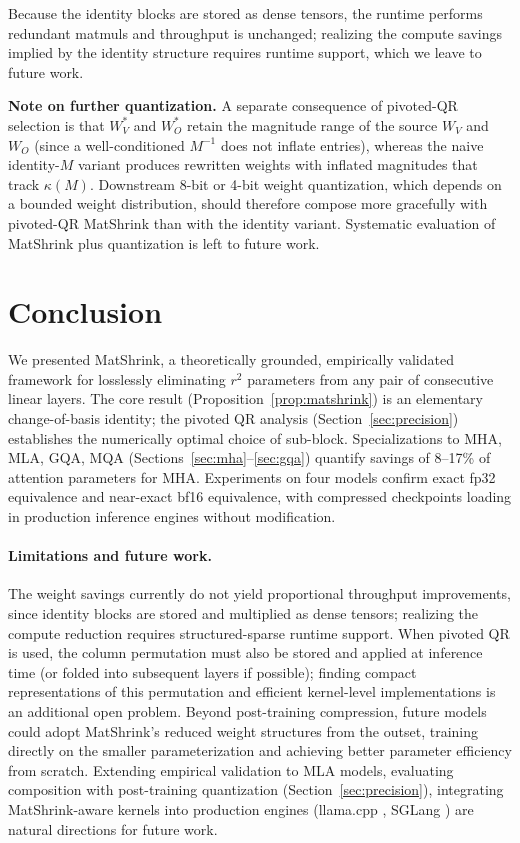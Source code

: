 \documentclass{article}
\begin{document}
Because the identity blocks are stored as dense tensors, the runtime performs redundant matmuls and throughput is unchanged; realizing the compute savings implied by the identity structure requires runtime support, which we leave to future work.

\textbf{Note on further quantization.} A separate consequence of pivoted-QR selection is that $W_V^\ast$ and $W_O^\ast$ retain the magnitude range of the source $W_V$ and $W_O$ (since a well-conditioned $M^{-1}$ does not inflate entries), whereas the naive identity-$M$ variant produces rewritten weights with inflated magnitudes that track $\kappa(M)$. Downstream 8-bit or 4-bit weight quantization, which depends on a bounded weight distribution, should therefore compose more gracefully with pivoted-QR MatShrink than with the identity variant. Systematic evaluation of MatShrink plus quantization is left to future work.

\section{Conclusion}
We presented MatShrink, a theoretically grounded, empirically validated framework for losslessly eliminating $r^2$ parameters from any pair of consecutive linear layers. The core result (Proposition~\ref{prop:matshrink}) is an elementary change-of-basis identity; the pivoted QR analysis (Section~\ref{sec:precision}) establishes the numerically optimal choice of sub-block. Specializations to MHA, MLA, GQA, MQA (Sections~\ref{sec:mha}--\ref{sec:gqa}) quantify savings of 8--17\% of attention parameters for MHA.
Experiments on four models confirm exact fp32 equivalence and near-exact bf16 equivalence, with compressed checkpoints loading in production inference engines without modification.

\paragraph{Limitations and future work.}
The weight savings currently do not yield proportional throughput improvements, since identity blocks are stored and multiplied as dense tensors; realizing the compute reduction requires structured-sparse runtime support.
When pivoted QR is used, the column permutation must also be stored and applied at inference time (or folded into subsequent layers if possible); finding compact representations of this permutation and efficient kernel-level implementations is an additional open problem.
Beyond post-training compression, future models could adopt MatShrink's reduced weight structures from the outset, training directly on the smaller parameterization and achieving better parameter efficiency from scratch.
Extending empirical validation to MLA models, evaluating composition with post-training quantization (Section~\ref{sec:precision}), integrating MatShrink-aware kernels into production engines (llama.cpp \citep{llama-cpp}, SGLang \citep{sglang}) are natural directions for future work.





\newpage

\end{document}
